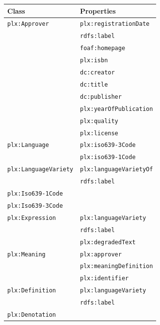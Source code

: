 \documentclass[sw]{iosart2c}
\begin{document}
\begin{table}
\begin{scriptsize}
\begin{tabular}{ll}
Class & Properties \\
\toprule
\texttt{plx:Approver} & \texttt{plx:registrationDate} \\
                      & \texttt{rdfs:label} \\
                      & \texttt{foaf:homepage} \\
                      & \texttt{plx:isbn} \\
                      & \texttt{dc:creator} \\
                      & \texttt{dc:title} \\
                      & \texttt{dc:publisher} \\
                      & \texttt{plx:yearOfPublication} \\
                      & \texttt{plx:quality} \\
                      & \texttt{plx:license} \\
\midrule
\texttt{plx:Language}
                      & \texttt{plx:iso639-3Code} \\
                      & \texttt{plx:iso639-1Code} \\
\midrule
\texttt{plx:LanguageVariety}
                      & \texttt{plx:languageVarietyOf} \\
                      & \texttt{rdfs:label} \\
\midrule
\texttt{plx:Iso639-1Code} & \\
\midrule
\texttt{plx:Iso639-3Code} & \\
\midrule
\texttt{plx:Expression}
                      & \texttt{plx:languageVariety} \\
                      & \texttt{rdfs:label} \\
                      & \texttt{plx:degradedText} \\
\midrule
\texttt{plx:Meaning}
                      & \texttt{plx:approver} \\
                      & \texttt{plx:meaningDefinition} \\
                      & \texttt{plx:identifier} \\
\midrule
\texttt{plx:Definition}
                      & \texttt{plx:languageVariety} \\
                      & \texttt{rdfs:label} \\
\midrule
\texttt{plx:Denotation}

\end{tabular}
\end{scriptsize}
\end{table}
\end{document}

